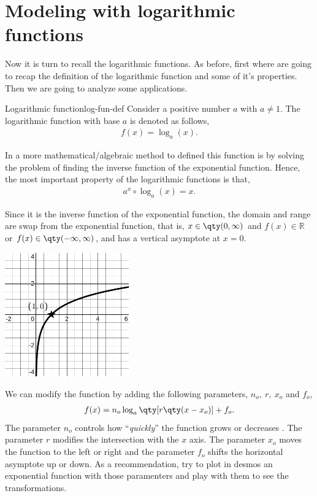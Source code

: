 \documentclass[../main.tex]{subfiles}
\begin{document}
\section{Modeling with logarithmic functions}

Now it is turn to recall the logarithmic functions.
As before, first where are going to recap the definition of the logarithmic function and some of it's properties.
Then we are going to analyze some applications.

\begin{definition}{Logarithmic function}{log-fun-def}
    Consider a positive number $a$ with $a\neq1$.
    The logarithmic function with base $a$ is denoted as follows,
    \begin{gather*}
        f(x) = \log_a(x).
    \end{gather*}
    
    In a more mathematical/algebraic method to defined this function is by solving the problem of finding the inverse function of the exponential function.
    Hence, the most important property of the logarithmic functions is that,
    \begin{gather*}
        a^x\circ\log_a(x) = x.
    \end{gather*}
    
    Since it is the inverse function of the exponential function, the domain and range are swap from the exponential function, that is, $x\in\qty(0,\infty)$ and $f(x)\in\mathbb{R}$ or $f(x)\in\qty(-\infty,\infty)$, and has a vertical asymptote at $x=0$.

    \centering
    \includegraphics[width=0.4\textwidth]{imgs/log-graph.png}
\end{definition}

We can modify the function by adding the following parameters, $n_o,~r,~x_o$ and $f_o$,
\begin{gather*}
    f(x) = n_o \log_a\qty[r\qty(x-x_o)] + f_o.
\end{gather*}
The parameter $n_o$ controls how ``\textit{quickly}'' the function grows or decreases .
The parameter $r$ modifies the intersection with the $x$ axis.
The parameter $x_o$ moves the function to the left or right and the parameter $f_o$ shifts the horizontal asymptote up or down.
As a recommendation, try to plot in desmos an exponential function with those paramenters and play with them to see the transformations.
\end{document}
